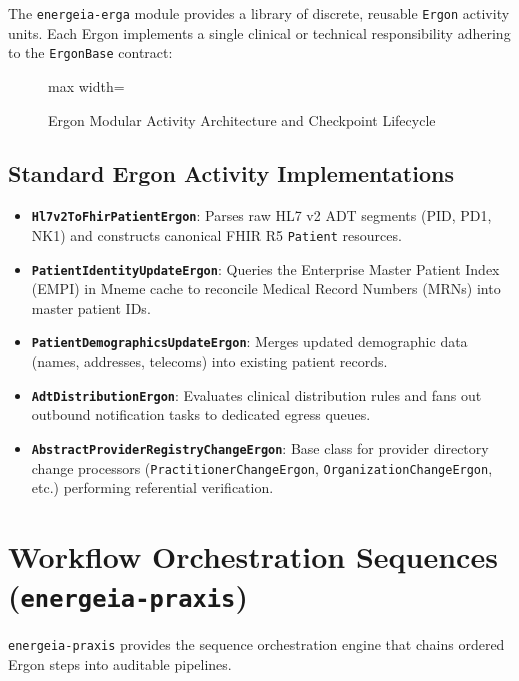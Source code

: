 The \texttt{energeia-erga} module provides a library of discrete, reusable \texttt{Ergon} activity units. Each Ergon implements a single clinical or technical responsibility adhering to the \texttt{ErgonBase} contract:

\begin{figure}[htbp]
    \centering
    \begin{adjustbox}{max width=\textwidth}
        
    \end{adjustbox}
    \caption{Ergon Modular Activity Architecture and Checkpoint Lifecycle}
    \label{fig:energeia_ergon_architecture}
\end{figure}

\subsection{Standard Ergon Activity Implementations}
\begin{itemize}
    \item \textbf{\texttt{Hl7v2ToFhirPatientErgon}}: Parses raw HL7 v2 ADT segments (PID, PD1, NK1) and constructs canonical FHIR R5 \texttt{Patient} resources.
    \item \textbf{\texttt{PatientIdentityUpdateErgon}}: Queries the Enterprise Master Patient Index (EMPI) in Mneme cache to reconcile Medical Record Numbers (MRNs) into master patient IDs.
    \item \textbf{\texttt{PatientDemographicsUpdateErgon}}: Merges updated demographic data (names, addresses, telecoms) into existing patient records.
    \item \textbf{\texttt{AdtDistributionErgon}}: Evaluates clinical distribution rules and fans out outbound notification tasks to dedicated egress queues.
    \item \textbf{\texttt{AbstractProviderRegistryChangeErgon}}: Base class for provider directory change processors (\texttt{PractitionerChangeErgon}, \texttt{OrganizationChangeErgon}, etc.) performing referential verification.
\end{itemize}

\section{Workflow Orchestration Sequences (\texttt{energeia-praxis})}

\texttt{energeia-praxis} provides the sequence orchestration engine that chains ordered Ergon steps into auditable pipelines.

